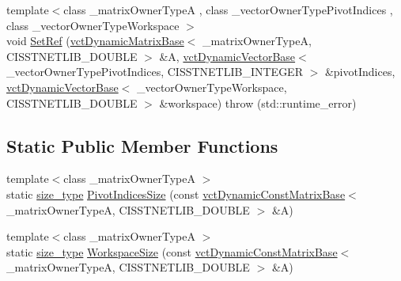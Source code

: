\begin{DoxyCompactItemize}
\item 
{\footnotesize template$<$class \-\_\-matrix\-Owner\-Type\-A , class \-\_\-vector\-Owner\-Type\-Pivot\-Indices , class \-\_\-vector\-Owner\-Type\-Workspace $>$ }\\void \hyperlink{classnmr_inverse_dynamic_data_a63ba1f6ac432d51a55e029277fb025ed}{Set\-Ref} (\hyperlink{classvct_dynamic_matrix_base}{vct\-Dynamic\-Matrix\-Base}$<$ \-\_\-matrix\-Owner\-Type\-A, C\-I\-S\-S\-T\-N\-E\-T\-L\-I\-B\-\_\-\-D\-O\-U\-B\-L\-E $>$ \&A, \hyperlink{classvct_dynamic_vector_base}{vct\-Dynamic\-Vector\-Base}$<$ \-\_\-vector\-Owner\-Type\-Pivot\-Indices, C\-I\-S\-S\-T\-N\-E\-T\-L\-I\-B\-\_\-\-I\-N\-T\-E\-G\-E\-R $>$ \&pivot\-Indices, \hyperlink{classvct_dynamic_vector_base}{vct\-Dynamic\-Vector\-Base}$<$ \-\_\-vector\-Owner\-Type\-Workspace, C\-I\-S\-S\-T\-N\-E\-T\-L\-I\-B\-\_\-\-D\-O\-U\-B\-L\-E $>$ \&workspace)  throw (std\-::runtime\-\_\-error)
\end{DoxyCompactItemize}
\subsection*{Static Public Member Functions}
\begin{DoxyCompactItemize}
\item 
{\footnotesize template$<$class \-\_\-matrix\-Owner\-Type\-A $>$ }\\static \hyperlink{classnmr_inverse_dynamic_data_aeb5c2317adf50d8fc7952a9b38bf0129}{size\-\_\-type} \hyperlink{classnmr_inverse_dynamic_data_ab327168662ab28ad8ae94e3b08acb7e7}{Pivot\-Indices\-Size} (const \hyperlink{classvct_dynamic_const_matrix_base}{vct\-Dynamic\-Const\-Matrix\-Base}$<$ \-\_\-matrix\-Owner\-Type\-A, C\-I\-S\-S\-T\-N\-E\-T\-L\-I\-B\-\_\-\-D\-O\-U\-B\-L\-E $>$ \&A)
\item 
{\footnotesize template$<$class \-\_\-matrix\-Owner\-Type\-A $>$ }\\static \hyperlink{classnmr_inverse_dynamic_data_aeb5c2317adf50d8fc7952a9b38bf0129}{size\-\_\-type} \hyperlink{classnmr_inverse_dynamic_data_ae35f9f1621272764b8e2b057410a9eeb}{Workspace\-Size} (const \hyperlink{classvct_dynamic_const_matrix_base}{vct\-Dynamic\-Const\-Matrix\-Base}$<$ \-\_\-matrix\-Owner\-Type\-A, C\-I\-S\-S\-T\-N\-E\-T\-L\-I\-B\-\_\-\-D\-O\-U\-B\-L\-E $>$ \&A)
\end{DoxyCompactItemize}
